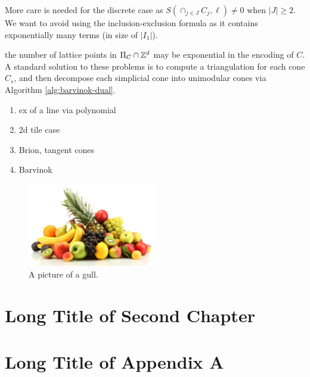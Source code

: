 More care is needed for the discrete case as $S(\cap_{j \in J} C_j, \ell) \neq 0$ when $|J| \geq 2$. We want to avoid using the inclusion-exclusion formula as it contains exponentially many terms (in size of $|I_1|$). 





the number of lattice points in $\Pi_C \cap {\mathbb Z}^d$ may be exponential in the encoding of $C$. A standard solution to these problems is to compute a triangulation for each cone $C_s$, and then decompose each simplicial cone into unimodular cones via Algorithm \ref{alg:barvinok-dual}.
 
 
   \begin{enumerate}
   \item ex of a line via polynomial
   \item 2d tile case
   \item Brion, tangent cones
   \item Barvinok
   
   \end{enumerate}
   
   
   
   \begin{figure}[h!]
  \caption{A picture of a gull.}
  \centering
    \includegraphics[width=0.5\textwidth]{figures/fruit.jpg}
\end{figure}
   
   
   
   
   

   \chapter[%
      Short Title of 2nd Ch.
   ]{%
      Long Title of Second Chapter
   }%
   \label{ch:2ndChapterLabel}
   
   
   \appendix

   \chapter[%
      Short Title of Appendix A
   ]{%
      Long Title of Appendix A
   }%
   \label{ch:AppendixALabel}
   
       
   \backmatter
   
   
   
